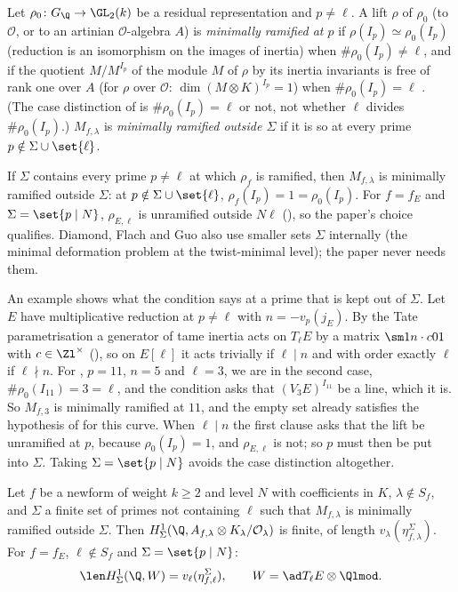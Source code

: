 \begin{definition}\label{def:congruence:minimally-ramified}
Let $\rho_0\colon G_\Q\to\GL_2(k)$ be a residual representation and $p\ne\ell$. A lift $\rho$ of $\rho_0$ (to $\mathcal O$, or to an artinian $\mathcal O$-algebra $A$) is \emph{minimally ramified at $p$} if
$\rho(I_p)\simeq\rho_0(I_p)$ (reduction is an isomorphism on the images of inertia) when $\#\rho_0(I_p)\ne\ell$, and if the quotient $M/M^{I_p}$ of the module $M$ of $\rho$ by its inertia invariants is free of rank one over $A$
(for $\rho$ over $\mathcal O$: $\dim(M\otimes K)^{I_p}=1$) when $\#\rho_0(I_p)=\ell$ \cite[Section 3.1, p.~715, and p.~717]{DFG04}. (The case distinction of \cite{DFG04} is $\#\rho_0(I_p)=\ell$ or not, not
whether $\ell$ divides $\#\rho_0(I_p)$.) $M_{f,\lambda}$ is \emph{minimally ramified outside $\Sigma$} if it is so at every prime $p\notin\Sigma\cup\set{\ell}$.
\end{definition}

If $\Sigma$ contains every prime $p\ne\ell$ at which $\rho_f$ is ramified, then $M_{f,\lambda}$ is minimally ramified outside $\Sigma$: at $p\notin\Sigma\cup\set{\ell}$, $\rho_f(I_p)=1=\rho_0(I_p)$. For $f=f_E$ and
$\Sigma=\set{p\mid N}$, $\rho_{E,\ell}$ is unramified outside $N\ell$ (), so the paper's choice qualifies. Diamond, Flach and Guo also use smaller sets $\Sigma$ internally (the minimal
deformation problem at the twist-minimal level); the paper never needs them.

An example shows what the condition says at a prime that is kept out of $\Sigma$. Let $E$ have multiplicative reduction at $p\ne\ell$ with $n=-v_p(j_E)$. By the Tate parametrisation a
generator of tame inertia acts on $T_\ell E$ by a matrix $\sm1{n\cdot c}01$ with $c\in\Zl^\times$ (), so on $E[\ell]$ it acts trivially if $\ell\mid n$ and with order exactly $\ell$ if
$\ell\nmid n$. For , $p=11$, $n=5$ and $\ell=3$, we are in the second case, $\#\rho_0(I_{11})=3=\ell$, and the condition asks that $(V_3E)^{I_{11}}$ be a line, which it is. So $M_{f,3}$ is
minimally ramified at $11$, and the empty set already satisfies the hypothesis of  for this curve. When $\ell\mid n$ the first clause asks that the lift be unramified at $p$,
because $\rho_0(I_p)=1$, and $\rho_{E,\ell}$ is not; so $p$ must then be put into $\Sigma$. Taking $\Sigma=\set{p\mid N}$ avoids the case distinction altogether.

\begin{theorem}\label{thm:congruence:dfg37}
Let $f$ be a newform of weight $k\ge2$ and level $N$ with coefficients in $K$, $\lambda\notin S_f$, and $\Sigma$ a finite set of primes not containing $\ell$ such that $M_{f,\lambda}$ is minimally
ramified outside $\Sigma$. Then $H^1_\Sigma(\Q,A_{f,\lambda}\otimes K_\lambda/\mathcal O_\lambda)$ is finite, of length $v_\lambda(\eta^\Sigma_{f,\lambda})$. For $f=f_E$, $\ell\notin S_f$ and $\Sigma=\set{p\mid N}$:
\[
\len H^1_\Sigma(\Q,W)=v_\ell(\eta^\Sigma_{f,\ell}),\qquad W=\ad T_\ell E\otimes\Qlmod.
\]
\end{theorem}

